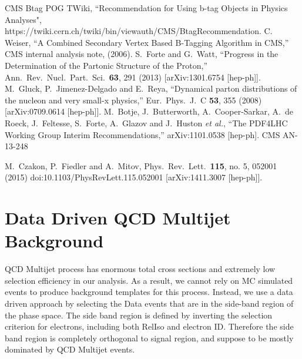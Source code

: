 \documentclass{cmspaperpdf}
\begin{document}
\begin{thebibliography}{9}
  CMS Btag POG TWiki, ``Recommendation for Using b-tag Objects in Physics Analyses", https://twiki.cern.ch/twiki/bin/viewauth/CMS/BtagRecommendation.
  C. Weiser, ``A Combined Secondary Vertex Based B-Tagging Algorithm in CMS,'' CMS internal analysis note, (2006).
  S.~Forte and G.~Watt,
  ``Progress in the Determination of the Partonic Structure of the Proton,''
  Ann.\ Rev.\ Nucl.\ Part.\ Sci.\  {\bf 63}, 291 (2013)
  [arXiv:1301.6754 [hep-ph]].
  M.~Gluck, P.~Jimenez-Delgado and E.~Reya,
  ``Dynamical parton distributions of the nucleon and very small-x physics,''
  Eur.\ Phys.\ J.\ C {\bf 53}, 355 (2008)
  [arXiv:0709.0614 [hep-ph]].
  M.~Botje, J.~Butterworth, A.~Cooper-Sarkar, A.~de Roeck, J.~Feltesse, S.~Forte, A.~Glazov and J.~Huston {\it et al.},
  ``The PDF4LHC Working Group Interim Recommendations,''
  arXiv:1101.0538 [hep-ph].
  CMS AN-13-248

  M.~Czakon, P.~Fiedler and A.~Mitov,
  Phys.\ Rev.\ Lett.\  {\bf 115}, no. 5, 052001 (2015)
  doi:10.1103/PhysRevLett.115.052001
  [arXiv:1411.3007 [hep-ph]].

  \end{thebibliography}

\clearpage

\appendix
\appendixpage
\addappheadtotoc

\section{Data Driven QCD Multijet Background}

QCD Multijet process has enormous total cross sections and extremely low selection efficiency in our analysis. As a result, we cannot rely on MC simulated events to produce background templates for this process. Instead, we use a data driven approach by selecting the Data events that are in the side-band region of the phase space. The side band region is defined by inverting the selection criterion for electrons, including both RelIso and electron ID. Therefore the side band region is completely orthogonal to signal region, and suppose to be mostly dominated by QCD Multijet events. 
\end{document}

